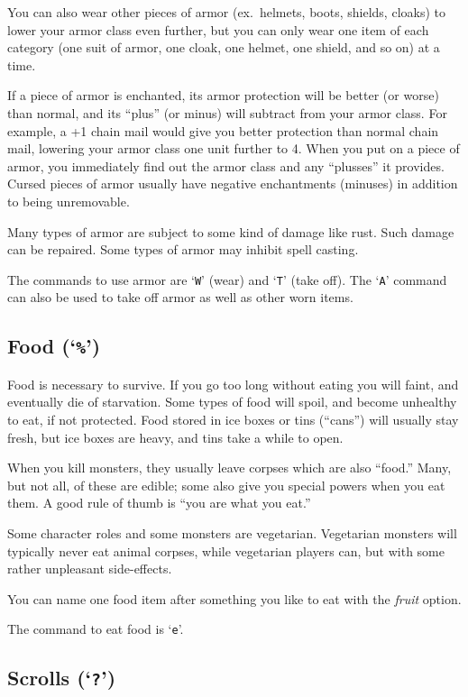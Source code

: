 \nd You can also wear other pieces of armor (ex.\ helmets, boots,
shields, cloaks)
to lower your armor class even further, but you can only wear one item
of each category (one suit of armor, one cloak, one helmet, one
shield, and so on) at a time.

If a piece of armor is enchanted, its armor protection will be better
(or worse) than normal, and its ``plus'' (or minus) will subtract from
your armor class.  For example, a +1 chain mail would give you
better protection than normal chain mail, lowering your armor class one
unit further to 4.  When you put on a piece of armor, you immediately
find out the armor class and any ``plusses'' it provides.  Cursed
pieces of armor usually have negative enchantments (minuses) in
addition to being unremovable.

Many types of armor are subject to some kind of damage like rust.  Such
damage can be repaired.  Some types of armor may inhibit spell casting.

The commands to use armor are `{\tt W}' (wear) and `{\tt T}' (take off).
The `{\tt A}' command can also be used to take off armor as well as other
worn items.

\subsection*{Food (`{\tt \%}')}

Food is necessary to survive.  If you go too long without eating you
will faint, and eventually die of starvation.
Some types of food will spoil, and become unhealthy to eat,
if not protected.
Food stored in ice boxes or tins (``cans'')
will usually stay fresh, but ice boxes are heavy, and tins
take a while to open.

When you kill monsters, they usually leave corpses which are also
``food.''  Many, but not all, of these are edible; some also give you
special powers when you eat them.  A good rule of thumb is ``you are
what you eat.''

Some character roles and some monsters are vegetarian.  Vegetarian monsters
will typically never eat animal corpses, while vegetarian players can,
but with some rather unpleasant side-effects.

You can name one food item after something you like to eat with the
{\it fruit\/} option.

The command to eat food is `{\tt e}'.

\subsection*{Scrolls (`{\tt ?}')}

